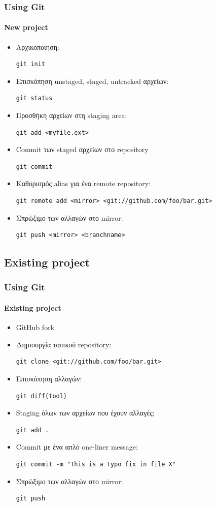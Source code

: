 \documentclass[]{beamer}
\begin{document}
\begin{frame}[fragile]
  \frametitle{Using Git}
  \framesubtitle{New project}
  \begin{itemize}
    \item Αρχικοποίηση:
\begin{verbatim}
git init
\end{verbatim}
    \item Επισκόπηση unstaged, staged, untracked αρχείων:
\begin{verbatim}
git status
\end{verbatim}
    \item Προσθήκη αρχείων στη staging area:
\begin{verbatim}
git add <myfile.ext>
\end{verbatim}
    \item Commit των staged αρχείων στο repository
\begin{verbatim}
git commit
\end{verbatim}
    \item Καθορισμός alias για ένα remote repository:
\begin{verbatim}
git remote add <mirror> <git://github.com/foo/bar.git>
\end{verbatim}
    \item Σπρώξιμο των αλλαγών στο mirror:
\begin{verbatim}
git push <mirror> <branchname>
\end{verbatim}
  \end{itemize}
\end{frame}

\subsection{Existing project}

\begin{frame}[fragile]
  \frametitle{Using Git}
  \framesubtitle{Existing project}
  \begin{itemize}
    \item GitHub fork
    \item Δημιουργία τοπικού repository:
\begin{verbatim}
git clone <git://github.com/foo/bar.git>
\end{verbatim}
    \item Επισκόπηση αλλαγών:
\begin{verbatim}
git diff(tool)
\end{verbatim}
    \item Staging όλων των αρχείων που έχουν αλλαγές:
\begin{verbatim}
git add .
\end{verbatim}
    \item Commit με ένα απλό one-liner message:
\begin{verbatim}
git commit -m "This is a typo fix in file X"
\end{verbatim}
    \item Σπρώξιμο των αλλαγών στο mirror:
\begin{verbatim}
git push
\end{verbatim}
  \end{itemize}
\end{frame}
\end{document}

